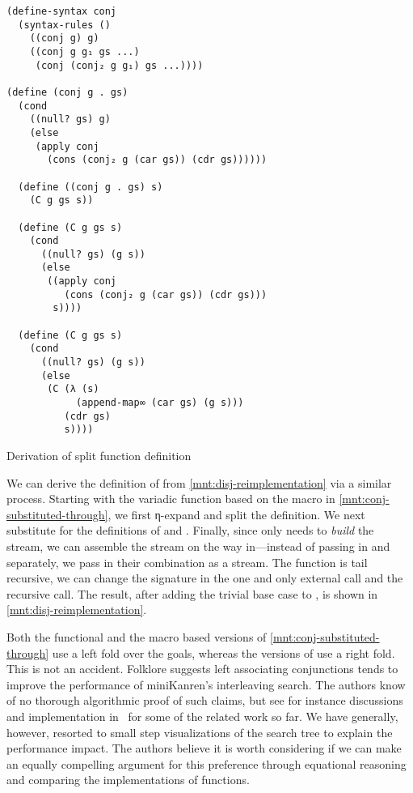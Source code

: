 \documentclass[sigplan,balance,pbalance,natbib=false]{acmart}
\begin{document}
\begin{listing}
\begin{verbatim}
(define-syntax conj
  (syntax-rules ()
    ((conj g) g)
    ((conj g g₁ gs ...)
     (conj (conj₂ g g₁) gs ...))))

(define (conj g . gs)
  (cond
    ((null? gs) g)
    (else
     (apply conj
       (cons (conj₂ g (car gs)) (cdr gs))))))

  (define ((conj g . gs) s)
    (C g gs s))

  (define (C g gs s)
    (cond
      ((null? gs) (g s))
      (else
       ((apply conj
          (cons (conj₂ g (car gs)) (cdr gs)))
        s))))

  (define (C g gs s)
    (cond
      ((null? gs) (g s))
      (else
       (C (λ (s)
            (append-map∞ (car gs) (g s)))
          (cdr gs)
          s))))
\end{verbatim}
  \caption{Derivation of split  function definition}\label{mnt:conj-substituted-through}
\end{listing}

We can derive the definition of  from
\cref{mnt:disj-reimplementation} via a similar process. Starting with
the variadic function based on the macro in
\cref{mnt:conj-substituted-through}, we first η-expand and split the
definition. We next substitute for the definitions
of  and . Finally,
since  only needs  to \emph{build} the
stream, we can assemble the stream on the way in---instead of passing
in  and  separately, we pass in their
combination as a stream. The function is tail recursive, we can change
the signature in the one and only external call and the recursive
call. The result, after adding the trivial base case
to , is shown in \cref{mnt:disj-reimplementation}.

Both the functional and the macro based versions of
\cref{mnt:conj-substituted-through} use a left fold over the goals,
whereas the versions of  use a right fold. This is
not an accident.
%
Folklore suggests left associating conjunctions tends to improve the
performance of miniKanren's interleaving search. The authors know of
no thorough algorithmic proof of such claims, but see for instance
discussions and implementation in~\cite{rosenblatt2019first} for some
of the related work so far. We have generally, however, resorted to
small step visualizations of the search tree to explain the
performance impact. The authors believe it is worth considering if we
can make an equally compelling argument for this preference through
equational reasoning and comparing the implementations of functions.
\end{document}
